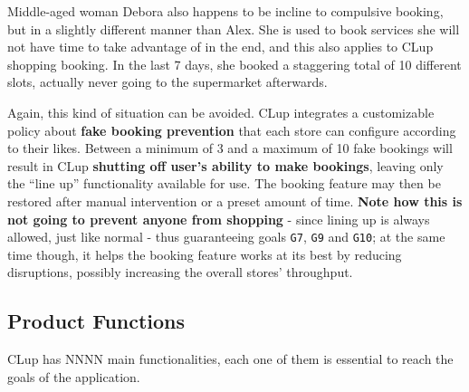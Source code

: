 Middle-aged woman Debora also happens to be incline to \guillemotleft compulsive booking\guillemotright, but in a slightly different manner than Alex. \newline
She is used to book services she will not have time to take advantage of in the end, and this also applies to CLup shopping booking. In the last 7 days, she booked a staggering total of 10 different slots, actually never going to the supermarket afterwards.

Again, this kind of situation can be avoided. CLup integrates a customizable policy about \textbf{fake booking prevention} that each store can configure according to their likes. \newline
Between a minimum of 3 and a maximum of 10 fake bookings will result in CLup \textbf{shutting off user's ability to make bookings}, leaving only the ``line up'' functionality available for use. The booking feature may then be restored after manual intervention or a preset amount of time. \newline
\textbf{Note how this is not going to prevent anyone from shopping} - since lining up is always allowed, just like normal - thus guaranteeing goals \texttt{G7}, \texttt{G9} and \texttt{G10}; at the same time though, it helps the booking feature works at its best by reducing disruptions, possibly increasing the overall stores' throughput.

\subsection{\sffamily Product Functions}
CLup has NNNN main functionalities, each one of them is essential to reach the goals of the application.\\

